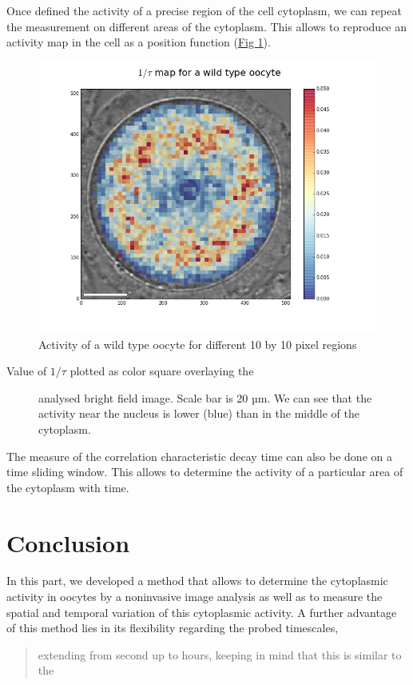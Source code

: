\documentclass[A4paperpaper,11pt,english]{sphinxmanual}
\begin{document}
Once defined the activity of a precise region of the cell cytoplasm, we
can repeat the measurement on different areas of the cytoplasm. This allows to
reproduce an activity map in the cell as a position function (\hyperref[parts/part5:fig-activity-map]{Fig  \ref*{parts/part5:fig-activity-map}}).
\begin{figure}[htbp]
\centering
\capstart

\includegraphics[width=0.950\linewidth]{CellAct-WT.png}
\caption{Activity of a wild type oocyte for different 10 by 10 pixel regions}\label{parts/part5:fig-activity-map}\end{figure}
\begin{description}
\item[{Value of \(1/\tau\) plotted as color square overlaying the}] \leavevmode
analysed bright field image. Scale
bar is 20 µm. We can see that the activity near the nucleus is lower
(blue) than in the middle of the cytoplasm.

\end{description}

The measure of the correlation characteristic decay time can also be done on a
time sliding window.  This allows to determine the activity of a
particular area of the cytoplasm with time.


\section{Conclusion}
\label{parts/part5:conclusion}
In this part, we developed a method that allows to determine the cytoplasmic
activity in oocytes by a noninvasive image analysis
as well as to measure the spatial and temporal variation of this cytoplasmic
activity. A further advantage of this method lies in its flexibility regarding the probed timescales,
\begin{quote}

extending from second up to hours, keeping in mind that this is similar to the
\end{quote}
\end{document}
